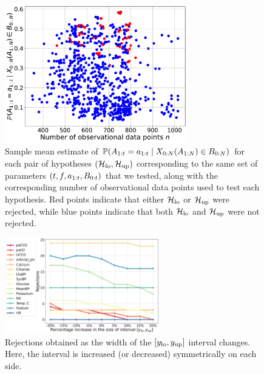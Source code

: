     \begin{figure}[t]
        \centering
        \includegraphics[height=6cm]{figures/causal/latest_experimental_results/propensity-plots_nogray.pdf}
        \caption{Sample mean estimate of $\mathbb{P}(A_{1:t} = a_{1:t} \mid X_{0:N}(A_{1:N}) \in B_{0:N})$ for each pair of hypotheses $(\mathcal{H}_{\mathrm{lo}}, \mathcal{H}_{\mathrm{up}})$ corresponding to the same set of parameters $(t, f, a_{1:t}, B_{0:t})$ that we tested, along with the corresponding number of observational data points used to test each hypothesis.
        Red points indicate that either $\mathcal{H}_{\mathrm{lo}}$ or $\mathcal{H}_{\mathrm{up}}$ were rejected, while blue points indicate that both $\mathcal{H}_{\mathrm{lo}}$ and $\mathcal{H}_{\mathrm{up}}$ were not rejected.}
        \label{fig:scatter-plot}
    \end{figure}


    \begin{figure}[t]
    \centering
\includegraphics[width=0.6\textwidth]{figures/causal/latest_experimental_results/sensitivity-plots-rejections_nogray.pdf}
    \caption{Rejections obtained as the width of the $[y_{\mathrm{lo}}, y_{\mathrm{up}}]$ interval changes. Here, the interval is increased (or decreased) symmetrically on each side.}
    \label{fig:sensitivity-plot-rejections}
\end{figure}

